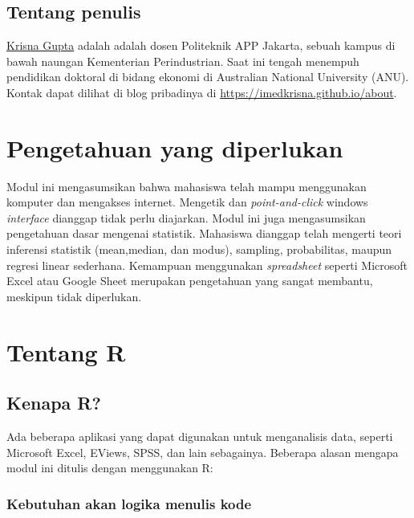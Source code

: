 \documentclass[
]{book}
\begin{document}
\hypertarget{tentang-penulis}{%
\subsection{Tentang penulis}\label{tentang-penulis}}

\href{https://imedkrisna.github.io/}{Krisna Gupta} adalah adalah dosen Politeknik APP Jakarta, sebuah kampus di bawah naungan Kementerian Perindustrian. Saat ini tengah menempuh pendidikan doktoral di bidang ekonomi di Australian National University (ANU). Kontak dapat dilihat di blog pribadinya di \url{https://imedkrisna.github.io/about}.

\hypertarget{pengetahuan-yang-diperlukan}{%
\section{Pengetahuan yang diperlukan}\label{pengetahuan-yang-diperlukan}}

Modul ini mengasumsikan bahwa mahasiswa telah mampu menggunakan komputer dan mengakses internet. Mengetik dan \emph{point-and-click} windows \emph{interface} dianggap tidak perlu diajarkan. Modul ini juga mengasumsikan pengetahuan dasar mengenai statistik. Mahasiswa dianggap telah mengerti teori inferensi statistik (mean,median, dan modus), sampling, probabilitas, maupun regresi linear sederhana. Kemampuan menggunakan \emph{spreadsheet} seperti Microsoft Excel atau Google Sheet merupakan pengetahuan yang sangat membantu, meskipun tidak diperlukan.

\hypertarget{tentang-r}{%
\section{Tentang R}\label{tentang-r}}

\hypertarget{kenapa-r}{%
\subsection{Kenapa R?}\label{kenapa-r}}

Ada beberapa aplikasi yang dapat digunakan untuk menganalisis data, seperti Microsoft Excel, EViews, SPSS, dan lain sebagainya. Beberapa alasan mengapa modul ini ditulis dengan menggunakan R:

\hypertarget{kebutuhan-akan-logika-menulis-kode}{%
\subsubsection{Kebutuhan akan logika menulis kode}\label{kebutuhan-akan-logika-menulis-kode}}
\end{document}
